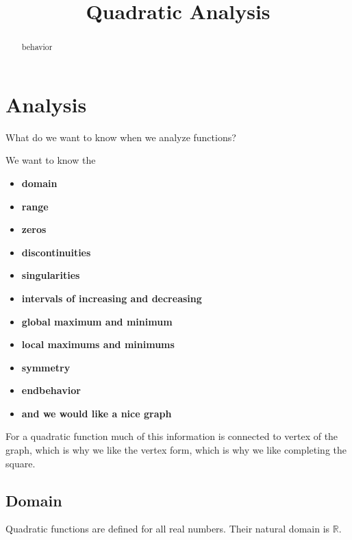 \documentclass{ximera}
\title{Quadratic Analysis}
\begin{document}
\begin{abstract}
behavior
\end{abstract}
\maketitle





\section{Analysis}

What do we want to know when we analyze functions?

We want to know the 
\begin{itemize}
\item \textbf{\textcolor{red!80!black}{domain}} 
\item \textbf{\textcolor{red!80!black}{range}} 
\item \textbf{\textcolor{red!80!black}{zeros}} 
\item \textbf{\textcolor{red!80!black}{discontinuities}} 
\item \textbf{\textcolor{red!80!black}{singularities}} 
\item \textbf{\textcolor{red!80!black}{intervals of increasing and decreasing}} 
\item \textbf{\textcolor{red!80!black}{global maximum and minimum}} 
\item \textbf{\textcolor{red!80!black}{local maximums and minimums}} 
\item \textbf{\textcolor{red!80!black}{symmetry}} 
\item \textbf{\textcolor{red!80!black}{endbehavior}}  \\
\item \textbf{\textcolor{purple!85!blue}{and we would like a nice graph}} 
\end{itemize}


For a quadratic function much of this information is connected to vertex of the graph, which is why we like the vertex form, which is why we like completing the square.



\subsection{Domain} 

Quadratic functions are defined for all real numbers.  Their natural domain is $\mathbb{R}$. \\
\end{document}
